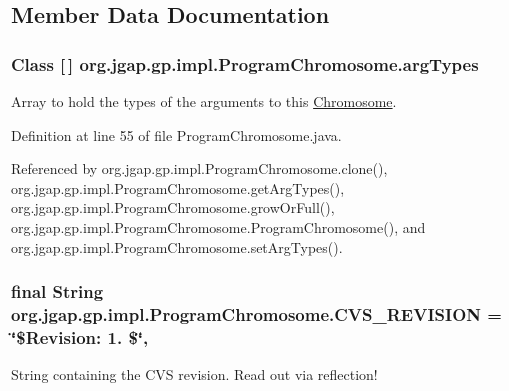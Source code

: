 \subsection{Member Data Documentation}
\hypertarget{classorg_1_1jgap_1_1gp_1_1impl_1_1_program_chromosome_a770064f02147733f5077b5b0bfa125fb}{
\subsubsection[{arg\-Types}]{\setlength{\rightskip}{0pt plus 5cm}Class \mbox{[}$\,$\mbox{]} org.\-jgap.\-gp.\-impl.\-Program\-Chromosome.\-arg\-Types\hspace{0.3cm}{\ttfamily [private]}}}\label{classorg_1_1jgap_1_1gp_1_1impl_1_1_program_chromosome_a770064f02147733f5077b5b0bfa125fb}
Array to hold the types of the arguments to this \hyperlink{classorg_1_1jgap_1_1_chromosome}{Chromosome}. 

Definition at line 55 of file Program\-Chromosome.\-java.



Referenced by org.\-jgap.\-gp.\-impl.\-Program\-Chromosome.\-clone(), org.\-jgap.\-gp.\-impl.\-Program\-Chromosome.\-get\-Arg\-Types(), org.\-jgap.\-gp.\-impl.\-Program\-Chromosome.\-grow\-Or\-Full(), org.\-jgap.\-gp.\-impl.\-Program\-Chromosome.\-Program\-Chromosome(), and org.\-jgap.\-gp.\-impl.\-Program\-Chromosome.\-set\-Arg\-Types().

\hypertarget{classorg_1_1jgap_1_1gp_1_1impl_1_1_program_chromosome_a1710d7febbb2e909bb1a9d41bba3aa17}{
\subsubsection[{C\-V\-S\-\_\-\-R\-E\-V\-I\-S\-I\-O\-N}]{\setlength{\rightskip}{0pt plus 5cm}final String org.\-jgap.\-gp.\-impl.\-Program\-Chromosome.\-C\-V\-S\-\_\-\-R\-E\-V\-I\-S\-I\-O\-N = \char`\"{}\$Revision\-: 1. \$\char`\"{}\hspace{0.3cm}{\ttfamily [static]}, {\ttfamily [private]}}}\label{classorg_1_1jgap_1_1gp_1_1impl_1_1_program_chromosome_a1710d7febbb2e909bb1a9d41bba3aa17}
String containing the C\-V\-S revision. Read out via reflection! 

